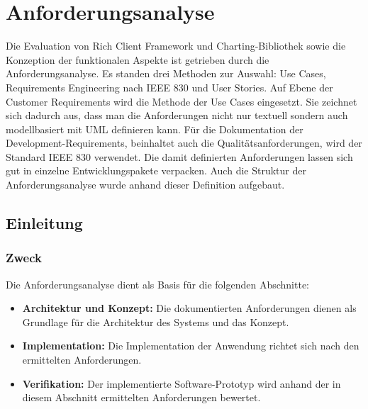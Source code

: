 \chapter{Anforderungsanalyse}\label{anforderungsanalyse}
Die Evaluation von Rich Client Framework und Charting-Bibliothek sowie die Konzeption der funktionalen Aspekte ist getrieben durch die Anforderungsanalyse. Es standen drei Methoden zur Auswahl: Use Cases, Requirements Engineering nach IEEE 830 und User Stories. Auf Ebene der Customer Requirements wird die Methode der Use Cases eingesetzt. Sie zeichnet sich dadurch aus, dass man die Anforderungen nicht nur textuell sondern auch modellbasiert mit UML definieren kann. Für die Dokumentation der Development-Requirements, beinhaltet auch die Qualitätsanforderungen, wird der Standard IEEE 830 verwendet. Die damit definierten Anforderungen lassen sich gut in einzelne Entwicklungspakete verpacken. Auch die Struktur der Anforderungsanalyse wurde anhand dieser Definition aufgebaut.


\section{Einleitung}
\subsection{Zweck}
Die Anforderungsanalyse dient als Basis für die folgenden Abschnitte:

\begin{itemize}
	\item \textbf{Architektur und Konzept:}  Die dokumentierten Anforderungen dienen als Grundlage für die Architektur des Systems und das Konzept. 
	\item \textbf{Implementation:} Die Implementation der Anwendung richtet sich nach den ermittelten Anforderungen. 
	\item \textbf{Verifikation:} Der implementierte Software-Prototyp wird anhand der in diesem Abschnitt ermittelten Anforderungen bewertet. 
\end{itemize}

